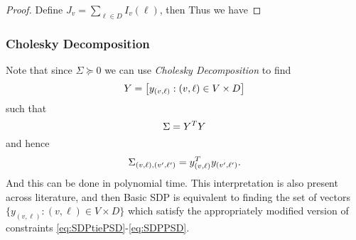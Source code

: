 \begin{proof}
Define $J_v = \sum_{\ell \in D} I_v(\ell)$, then 
Thus we have 
\end{proof}

\subsubsection{Cholesky Decomposition}
Note that since $\Sigma \succeq 0$ we can use \emph{Cholesky Decomposition} to find 
$$Y = \left[y_{(v, \ell)}: (v, \ell) \in V \times D\right]$$
such that 
$$\Sigma = Y^T Y$$ and hence $$ \Sigma_{(v, \ell), (v', \ell')} = y_{(v, \ell)}^T y_{(v', \ell')}.$$
And this can be done in polynomial time. This interpretation is also present across literature, and then Basic SDP is equivalent to finding the set of vectors $\{y_{(v, \ell)} : (v, \ell) \in V \times D\}$ which satisfy the appropriately modified version of constraints \ref{eq:SDPtiePSD}-\ref{eq:SDPPSD}.


